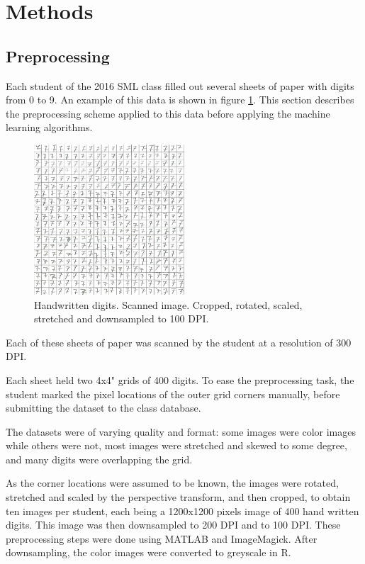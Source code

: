 \section{Methods}
\subsection{Preprocessing}
\label{sec:preprocessing}
Each student of the 2016 SML class filled out several sheets of paper
with digits from 0 to 9. An example of this data
is shown in figure 
\ref{fig:handwriten_digits}. 
This section describes the preprocessing scheme
applied to this data before applying the machine learning algorithms.
\begin{figure}[ht]
\centering
\includegraphics[width = 0.5\textwidth]{img/cropY2016G2M1-100-7.png}
\caption[Handwritten digits]
{
Handwritten digits. Scanned image. Cropped, rotated, scaled, stretched
and downsampled to 100 DPI.
}
\label{fig:handwriten_digits}
\end{figure}
Each of these sheets of paper was scanned by the student at a resolution of 300 DPI.

Each sheet held two 4x4" grids of 400 digits.
To ease the preprocessing task,
the student marked the pixel locations of the outer grid corners manually,
before submitting the dataset to the class database.

The datasets were of varying quality and format:
some images were color images while others were not,
most images were stretched and skewed to some degree,
and many digits were overlapping the grid.

As the corner locations were assumed to be known,
the images were rotated, stretched and scaled
by the perspective transform,
and then cropped,
to obtain ten images per student,
each being a 1200x1200 pixels image of 400 hand written digits.
This image was then downsampled to 200 DPI and to 100 DPI.
These preprocessing steps were done using MATLAB and ImageMagick.
After downsampling, the color images were converted to greyscale in R.

